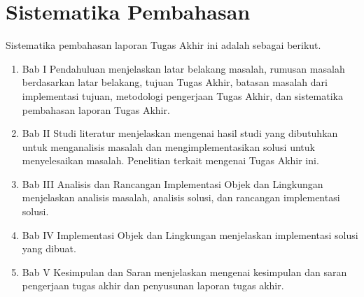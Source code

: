 \section{Sistematika Pembahasan}
Sistematika pembahasan laporan Tugas Akhir ini adalah sebagai berikut.

\begin{enumerate}

    \item Bab I Pendahuluan menjelaskan latar belakang masalah, rumusan masalah
    berdasarkan latar belakang, tujuan Tugas Akhir, batasan masalah dari
    implementasi tujuan, metodologi pengerjaan Tugas Akhir, dan sistematika
    pembahasan laporan Tugas Akhir.

    \item Bab II Studi literatur menjelaskan mengenai hasil studi yang
    dibutuhkan untuk menganalisis masalah dan mengimplementasikan solusi untuk
    menyelesaikan masalah. Penelitian terkait mengenai Tugas Akhir ini.

    \item Bab III Analisis dan Rancangan Implementasi Objek dan Lingkungan
    menjelaskan analisis masalah, analisis solusi, dan rancangan implementasi
    solusi.

    \item Bab IV Implementasi Objek dan Lingkungan menjelaskan implementasi
    solusi yang dibuat.

    \item Bab V Kesimpulan dan Saran menjelaskan mengenai kesimpulan dan saran
    pengerjaan tugas akhir dan penyusunan laporan tugas akhir.

\end{enumerate}
